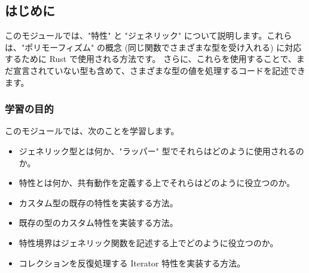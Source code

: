\subsection{はじめに}

このモジュールでは、"特性" と "ジェネリック" について説明します。これらは、"ポリモーフィズム" の概念 (同じ関数でさまざまな型を受け入れる) に対応するために Rust で使用される方法です。 さらに、これらを使用することで、まだ宣言されていない型も含めて、さまざまな型の値を処理するコードを記述できます。


\subsubsection{学習の目的}

このモジュールでは、次のことを学習します。

\begin{itemize}
\item ジェネリック型とは何か、"ラッパー" 型でそれらはどのように使用されるのか。
\item 特性とは何か、共有動作を定義する上でそれらはどのように役立つのか。
\item カスタム型の既存の特性を実装する方法。
\item 既存の型のカスタム特性を実装する方法。
\item 特性境界はジェネリック関数を記述する上でどのように役立つのか。
\item コレクションを反復処理する Iterator 特性を実装する方法。
\end{itemize}